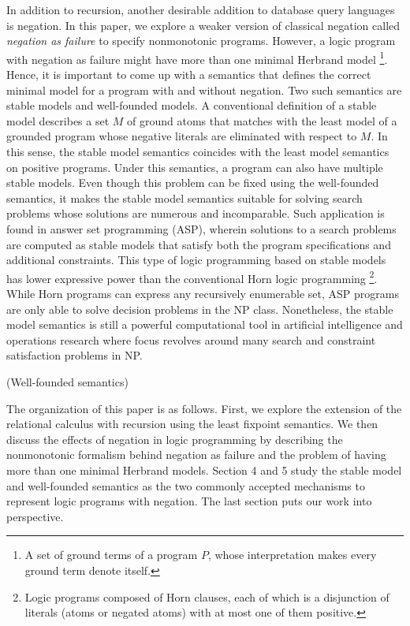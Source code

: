 In addition to recursion, another desirable addition to database query languages 
is negation. In this paper, we explore a weaker version of classical negation called 
\emph{negation as failure} to specify nonmonotonic programs. However, a logic 
program with negation as failure might have more than one minimal Herbrand model 
\footnote{A set of ground terms of a program $P$, whose interpretation 
makes every ground term denote itself.}. Hence, it is important 
to come up with a semantics that defines the correct minimal 
model for a program with and without negation. Two such semantics 
are stable models and well-founded models. A conventional 
definition of a stable model
describes a set $M$ of ground atoms that matches with the least model 
of a grounded program whose negative literals are eliminated with respect to 
$M$. In this sense, the stable model semantics coincides with 
the least model semantics on positive programs. Under this 
semantics, a program can also have multiple stable models. Even though 
this problem can be fixed using the well-founded semantics, 
it makes the stable model semantics suitable for solving search 
problems whose solutions are numerous and incomparable. Such 
application is found in answer set programming (ASP), wherein 
solutions to a search problems are computed as stable models 
that satisfy both the program specifications and additional constraints. 
This type of logic programming based on stable models has lower 
expressive power than the conventional Horn logic programming 
\footnote{Logic programs composed of Horn clauses, 
each of which is a disjunction of literals (atoms or negated atoms) with at most one of 
them positive.}. While Horn programs can express any recursively enumerable set, 
ASP programs are only able to solve decision problems in the NP class. 
Nonetheless, the stable model semantics is still 
a powerful computational tool in artificial 
intelligence and operations research where focus 
revolves around many search and constraint satisfaction 
problems in NP.

(Well-founded semantics)

The organization of this paper is as follows. First, we 
explore the extension of the relational calculus with recursion 
using the least fixpoint semantics. We then discuss the effects 
of negation in logic programming by describing the nonmonotonic 
formalism behind negation as failure and the problem of 
having more than one minimal Herbrand models. Section 4 and 5 
study the stable model and well-founded semantics as the two 
commonly accepted mechanisms to represent logic programs with 
negation. The last section puts our work into perspective.